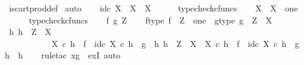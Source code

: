 \begin{isabellebody}
\endisadelimproof
%
\isatagproof
{}\isamarkupfalse%
\ is{\isacharunderscore}{\kern0pt}cart{\isacharunderscore}{\kern0pt}prod{\isacharunderscore}{\kern0pt}def\isanewline
{}\isamarkupfalse%
\ auto\isanewline
\ \ \isamarkupfalse%
\ {\isachardoublequoteopen}id\isactrlsub c\ X\ {\isacharcolon}{\kern0pt}\ X\ {\isasymrightarrow}\ X{\isachardoublequoteclose}\isanewline
\ \ \ \ \isamarkupfalse%
\ typecheck{\isacharunderscore}{\kern0pt}cfuncs\isanewline
{}\isamarkupfalse%
\isanewline
\ \ \isamarkupfalse%
\ {\isachardoublequoteopen}{\isasymbeta}\isactrlbsub X\isactrlesub \ {\isacharcolon}{\kern0pt}\ X\ {\isasymrightarrow}\ one{\isachardoublequoteclose}\isanewline
\ \ \ \ \isamarkupfalse%
\ typecheck{\isacharunderscore}{\kern0pt}cfuncs\isanewline
{}\isamarkupfalse%
\isanewline
\ \ \isamarkupfalse%
\ f\ g\ Z\isanewline
\ \ \isamarkupfalse%
\ f{\isacharunderscore}{\kern0pt}type{\isacharcolon}{\kern0pt}\ {\isachardoublequoteopen}f\ {\isacharcolon}{\kern0pt}\ Z\ {\isasymrightarrow}\ one{\isachardoublequoteclose}\ \ g{\isacharunderscore}{\kern0pt}type{\isacharcolon}{\kern0pt}\ {\isachardoublequoteopen}g\ {\isacharcolon}{\kern0pt}\ Z\ {\isasymrightarrow}\ X{\isachardoublequoteclose}\isanewline
\ \ \isamarkupfalse%
\ \isamarkupfalse%
\ {\isachardoublequoteopen}{\isasymexists}h{\isachardot}{\kern0pt}\ h\ {\isacharcolon}{\kern0pt}\ Z\ {\isasymrightarrow}\ X\ {\isasymand}\isanewline
\ \ \ \ \ \ \ \ \ \ \ {\isasymbeta}\isactrlbsub X\isactrlesub \ {\isasymcirc}\isactrlsub c\ h\ {\isacharequal}{\kern0pt}\ f\ {\isasymand}\ id\isactrlsub c\ X\ {\isasymcirc}\isactrlsub c\ h\ {\isacharequal}{\kern0pt}\ g\ {\isasymand}\ {\isacharparenleft}{\kern0pt}{\isasymforall}h{}{\isachardot}{\kern0pt}\ h{}\ {\isacharcolon}{\kern0pt}\ Z\ {\isasymrightarrow}\ X\ {\isasymand}\ {\isasymbeta}\isactrlbsub X\isactrlesub \ {\isasymcirc}\isactrlsub c\ h{}\ {\isacharequal}{\kern0pt}\ f\ {\isasymand}\ id\isactrlsub c\ X\ {\isasymcirc}\isactrlsub c\ h{}\ {\isacharequal}{\kern0pt}\ g\ {\isasymlongrightarrow}\ h{}\ {\isacharequal}{\kern0pt}\ h{\isacharparenright}{\kern0pt}{\isachardoublequoteclose}\isanewline
\ \ \isamarkupfalse%
\ {\isacharparenleft}{\kern0pt}rule{\isacharunderscore}{\kern0pt}tac\ x{\isacharequal}{\kern0pt}g\ \ exI{\isacharcomma}{\kern0pt}\ auto{\isacharparenright}{\kern0pt}\isanewline
\ \ \ \ \isamarkupfalse%

\end{isabellebody}
